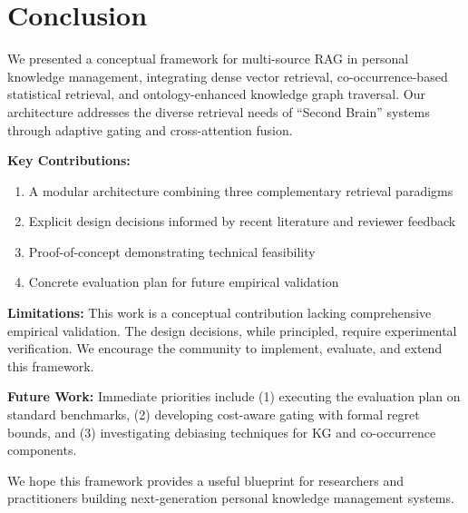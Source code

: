 \documentclass[11pt,a4paper]{article}
\begin{document}
\section{Conclusion}
\label{sec:conclusion}

We presented a conceptual framework for multi-source RAG in personal knowledge management, integrating dense vector retrieval, co-occurrence-based statistical retrieval, and ontology-enhanced knowledge graph traversal. Our architecture addresses the diverse retrieval needs of ``Second Brain'' systems through adaptive gating and cross-attention fusion.

\textbf{Key Contributions:}
\begin{enumerate}
    \item A modular architecture combining three complementary retrieval paradigms
    \item Explicit design decisions informed by recent literature and reviewer feedback
    \item Proof-of-concept demonstrating technical feasibility
    \item Concrete evaluation plan for future empirical validation
\end{enumerate}

\textbf{Limitations:} This work is a conceptual contribution lacking comprehensive empirical validation. The design decisions, while principled, require experimental verification. We encourage the community to implement, evaluate, and extend this framework.

\textbf{Future Work:} Immediate priorities include (1) executing the evaluation plan on standard benchmarks, (2) developing cost-aware gating with formal regret bounds, and (3) investigating debiasing techniques for KG and co-occurrence components.

We hope this framework provides a useful blueprint for researchers and practitioners building next-generation personal knowledge management systems.
\end{document}
